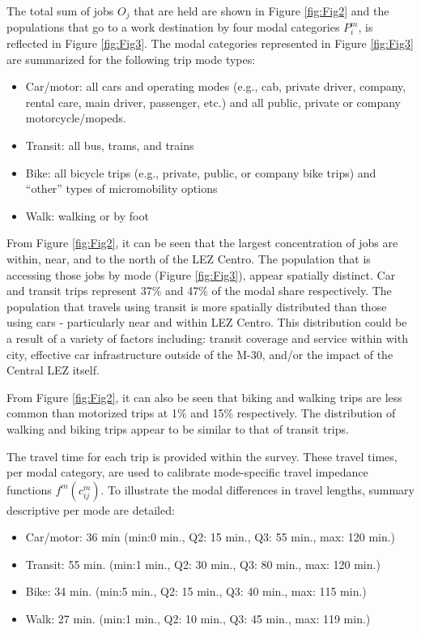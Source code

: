 \documentclass[]{trbunofficial}
\providecommand{\tightlist}{%
  \setlength{\itemsep}{0pt}\setlength{\parskip}{0pt}}
\begin{document}
The total sum of jobs \(O_j\) that are held are shown in Figure
\ref{fig:Fig2} and the populations that go to a work destination by four
modal categories \(P^m_i\), is reflected in Figure \ref{fig:Fig3}. The
modal categories represented in Figure \ref{fig:Fig3} are summarized for
the following trip mode types:

\begin{itemize}
\tightlist
\item
  Car/motor: all cars and operating modes (e.g., cab, private driver,
  company, rental care, main driver, passenger, etc.) and all public,
  private or company motorcycle/mopeds.
\item
  Transit: all bus, trams, and trains
\item
  Bike: all bicycle trips (e.g., private, public, or company bike trips)
  and ``other'' types of micromobility options
\item
  Walk: walking or by foot
\end{itemize}

From Figure \ref{fig:Fig2}, it can be seen that the largest
concentration of jobs are within, near, and to the north of the LEZ
Centro. The population that is accessing those jobs by mode (Figure
\ref{fig:Fig3}), appear spatially distinct. Car and transit trips
represent 37\% and 47\% of the modal share respectively. The population
that travels using transit is more spatially distributed than those
using cars - particularly near and within LEZ Centro. This distribution
could be a result of a variety of factors including: transit coverage
and service within with city, effective car infrastructure outside of
the M-30, and/or the impact of the Central LEZ itself.

From Figure \ref{fig:Fig2}, it can also be seen that biking and walking
trips are less common than motorized trips at 1\% and 15\% respectively.
The distribution of walking and biking trips appear to be similar to
that of transit trips.

The travel time for each trip is provided within the survey. These
travel times, per modal category, are used to calibrate mode-specific
travel impedance functions \(f^m(c_{ij}^m)\). To illustrate the modal
differences in travel lengths, summary descriptive per mode are
detailed:

\begin{itemize}
\tightlist
\item
  Car/motor: 36 min (min:0 min., Q2: 15 min., Q3: 55 min., max: 120
  min.)
\item
  Transit: 55 min. (min:1 min., Q2: 30 min., Q3: 80 min., max: 120 min.)
\item
  Bike: 34 min. (min:5 min., Q2: 15 min., Q3: 40 min., max: 115 min.)
\item
  Walk: 27 min. (min:1 min., Q2: 10 min., Q3: 45 min., max: 119 min.)
\end{itemize}
\end{document}
